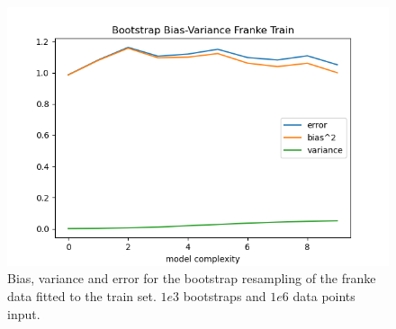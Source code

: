 \documentclass[15pt comic sans]{revtex4-2}
\begin{document}
\begin{figure}[hbtp]
\includegraphics[scale=0.7]{
	../plots/frankeBootstrapBiasVariancesigma1poly10boot1e3datapt1e6train.png}
\caption{
	Bias, variance and error for the bootstrap resampling of the franke data fitted to 
	the train set. $1e3$ bootstraps and $1e6$ data points input. 
	}
\label{fig:BootstrapBiasVariance1e6train}
\end{figure}


\end{document}
